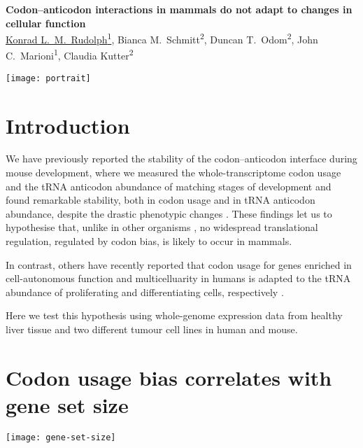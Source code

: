 \documentclass[a0,portrait]{a0poster}
\begin{document}
\sffamily

\noindent
\begin{minipage}[][10cm][t]{0.88\textwidth}
    {
        \VeryHuge\color{accent}\bfseries\sffamily%
        Codon–anticodon interactions in mammals do not adapt to changes in
        cellular function
    }
    {
        \\[\baselineskip]
        \noindent
        \Large\color{Black}%
        \underline{Konrad L.\ M.\ Rudolph\textsuperscript{1}},
        Bianca M.\ Schmitt\textsuperscript{2},
        Duncan T.\ Odom\textsuperscript{2},
        John C.\ Marioni\textsuperscript{1},
        Claudia Kutter\textsuperscript{2}
    }
\end{minipage}%
\hfill%
\begin{minipage}[][10cm][t]{0.1\textwidth}
    \raggedleft
    \texttt{[image: portrait]}
\end{minipage}

\vspace{3cm}
\Large

\noindent
\begin{minipage}[t][][t]{0.45\textwidth}
    \section*{Introduction}
    We have previously reported the stability of the codon--anticodon interface
    during mouse development, where we measured the whole-transcriptome codon
    usage and the tRNA anticodon abundance of matching stages of development and
    found remarkable stability, both in codon usage and in tRNA anticodon
    abundance, despite the drastic phenotypic changes \citep{Schmitt:2014}.
    These findings let us to hypothesise that, unlike in other organisms
    \citep{Carlini:2003}, no widespread translational regulation, regulated by
    codon bias, is likely to occur in mammals.

    In contrast, others have recently reported that codon usage for genes
    enriched in cell-autonomous function and multicelluarity in humans is
    adapted to the tRNA abundance of proliferating and differentiating cells,
    respectively \citep{Gingold:2014}.

    Here we test this hypothesis using whole-genome expression data from healthy
    liver tissue and two different tumour cell lines in human and mouse.
\end{minipage}%
\hfill%
\begin{minipage}[t][][t]{0.5\textwidth}
    \section*{Codon usage bias correlates with gene set size}
    \texttt{[image: gene-set-size]}
\end{minipage}
\end{document}

